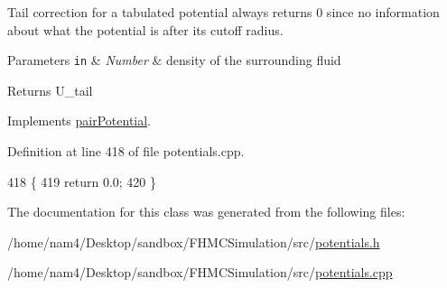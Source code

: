Tail correction for a tabulated potential always returns 0 since no information about what the potential is after its cutoff radius. 


\begin{DoxyParams}[1]{Parameters}
\mbox{\tt in}  & {\em Number} & density of the surrounding fluid\\
\hline
\end{DoxyParams}
\begin{DoxyReturn}{Returns}
U\-\_\-tail 
\end{DoxyReturn}


Implements \hyperlink{classpair_potential_a5387d21d8d487d1d42e9eaf7cae9175b}{pair\-Potential}.



Definition at line 418 of file potentials.\-cpp.


\begin{DoxyCode}
418                                                      \{
419     \textcolor{keywordflow}{return} 0.0;
420 \}
\end{DoxyCode}


The documentation for this class was generated from the following files\-:\begin{DoxyCompactItemize}
\item 
/home/nam4/\-Desktop/sandbox/\-F\-H\-M\-C\-Simulation/src/\hyperlink{potentials_8h}{potentials.\-h}\item 
/home/nam4/\-Desktop/sandbox/\-F\-H\-M\-C\-Simulation/src/\hyperlink{potentials_8cpp}{potentials.\-cpp}\end{DoxyCompactItemize}
